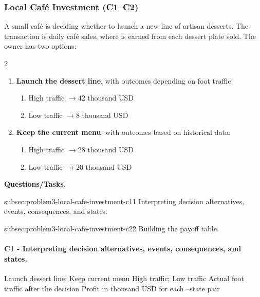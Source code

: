 	\subsubsection{Local Café Investment (C1--C2)}
	\label{sec:problem3-local-cafe-investment-c1-c2}
	A small café is deciding whether to launch a new line of artisan desserts. The transaction is daily café sales, where  is earned from each dessert plate sold. The owner has two options:
	\begin{multicols}{2}
		\begin{enumerate}[label=\arabic*.]
			\item \textbf{Launch the dessert line}, with  outcomes depending on foot traffic:
			\begin{enumerate}[label=\roman*)]
				\item High traffic $\to 42$ thousand USD
				\item Low traffic $\to 8$ thousand USD
			\end{enumerate}

			\columnbreak

			\item \textbf{Keep the current menu}, with  outcomes based on historical data:
			\begin{enumerate}[label=\roman*)]
				\item High traffic $\to 28$ thousand USD
				\item Low traffic $\to 20$ thousand USD
			\end{enumerate}
		\end{enumerate}
	\end{multicols}

	\textbf{Questions/Tasks.}
	\begin{enumerate}
		\CriterionTask
		{subsec:problem3-local-cafe-investment-c1}{1}
		{Interpreting decision alternatives, events, consequences, and states.}

		\CriterionTask
		{subsec:problem3-local-cafe-investment-c2}{2}
		{Building the payoff table.}
	\end{enumerate}

	\paragraph*{C1 - Interpreting decision alternatives, events, consequences, and states.}
	\label{subsec:problem3-local-cafe-investment-c1}

	\DecisionElementsTable
	{Launch dessert line; Keep current menu}
	{High traffic; Low traffic}
	{Actual foot traffic after the decision}
	{Profit in thousand USD for each --state pair}

